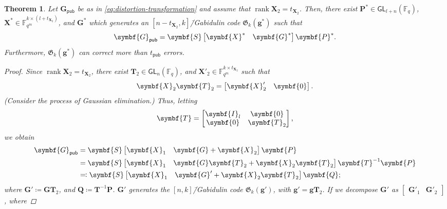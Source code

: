 \documentclass[version=last, paper=A4, parskip=half, oneside]{scrbook}
\theoremstyle{plain}
\newtheorem{theorem}{Theorem}
\theoremstyle{definition}
\theoremstyle{remark}
\renewcommand*{\vec}{\symbf}
\newcommand*{\mat}{\symbf}
\DeclareMathOperator{\rank}{rank}
\newcommand*{\GL}{\ensuremath{\mathsf{GL}}}
\newcommand*{\pub}{\ensuremath{\mathsf{pub}}}
\newcommand*{\FF}{\ensuremath{\mathbb{F}}}
\newcommand*{\Gab}{\ensuremath{\mathfrak{G}}}
\begin{document}
\begin{theorem}
  Let \(\mat{G}_{\pub}\) be as in \cref{eq:distortion-transformation} and assume
  that \(\rank \mat{X}_2 = t_{\mat{X}_2}\).  Then, there exist
  \(\mat{P}^* \in \GL_{l + n}(\FF_q)\),
  \(\mat{X}^* \in \FF_{q^m}^{k \times (l + t_{\mat{X}_2})}\), and \(\mat{G}^*\)
  which generates an \([n - t_{\mat{X}_2}, k]\)\=/Gabidulin code
  \(\Gab_k(\vec{g}^*)\) such that
  \[
    \mat{G}_{\pub} =
    \mat{S} \begin{bmatrix} \mat{X}^* & \mat{G}^* \end{bmatrix} \mat{P}^*\text.
  \]
  Furthermore, \(\Gab_k(\vec{g}^*)\) can correct more than \(t_{\pub}\) errors.
  \begin{proof}
    Since \(\rank \mat{X}_2 = t_{\mat{X}_2}\), there exist
    \(\mat{T}_2 \in \GL_n(\FF_q)\), and
    \(\mat{X}'_2 \in \FF_{q^m}^{k \times t_{\mat{X}_2}}\) such that
    \[
      \mat{X}_2 \mat{T}_2 = \begin{bmatrix} \mat{X}'_2 & \mat{0} \end{bmatrix}\text.
    \]
    (Consider the process of Gaussian elimination.)  Thus, letting
    \[
      \mat{T} =
      \begin{bmatrix}
        \mat{I}_l & \mat{0} \\
        \mat{0} & \mat{T}_2
      \end{bmatrix}\text,
    \]
    we obtain
    \[
      \begin{aligned}
        \mat{G}_{\pub} &= \mat{S} \begin{bmatrix} \mat{X}_1 & \mat{G} + \mat{X}_2 \end{bmatrix} \mat{P} \\
        &= \mat{S} \begin{bmatrix} \mat{X}_1 & \mat{G} \mat{T}_2 + \mat{X}_2 \mat{T}_2 \end{bmatrix} \mat{T}^{-1} \mat{P} \\
        &\eqqcolon \mat{S} \begin{bmatrix} \mat{X}_1 & \mat{G}' + \mat{X}_2 \mat{T}_2 \end{bmatrix} \mat{Q}\text;
      \end{aligned}
    \]
    where \(\mat{G}' \coloneqq \mat{G} \mat{T}_2\), and
    \(\mat{Q} \coloneqq \mat{T}^{-1} \mat{P}\).  \(\mat{G}'\) generates the
    \([n, k]\)\=/Gabidulin code \(\Gab_k(\vec{g}')\), with
    \(\vec{g}' = \vec{g} \mat{T}_2\).  If we decompose \(\mat{G}'\) as
    \(\begin{bmatrix} \mat{G}'_1 & \mat{G}'_2 \end{bmatrix}\), where

\end{proof}
\end{theorem}
\end{document}
